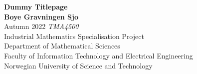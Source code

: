 \begin{titlepage}
    \begin{center}
        \vspace*{1cm}
        \Huge
        \textbf{Dummy Titlepage}\\

        \large
        \vspace{1.5cm}
        \textbf{Boye Gravningen Sjo}\\
        \vspace{0.5cm}
        Autumn 2022
        \vspace{0.5cm}
        \vfill
        \textit{TMA4500} \\[0.3cm]
        Industrial Mathematics Specialisation Project \\[0.3cm]
        Department of Mathematical Sciences \\[0.3cm]
        Faculty of Information Technology and Electrical Engineering \\[0.3cm]
        Norwegian University of Science and Technology
    \end{center}
\end{titlepage}
\thispagestyle{empty}
\cleardoublepage